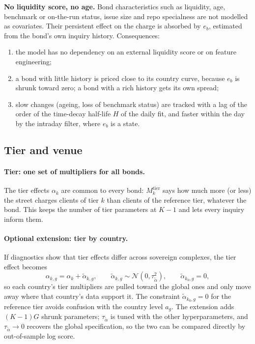 \documentclass[11pt,a4paper]{article}
\theoremstyle{definition}
\theoremstyle{remark}
\begin{document}
\begin{decision}
\textbf{No liquidity score, no age.} Bond characteristics such as liquidity, age, benchmark or on-the-run status, issue size and repo specialness are not modelled as covariates. Their persistent effect on the charge is absorbed by $e_b$, estimated from the bond's own inquiry history. Consequences:
\begin{enumerate}[itemsep=1pt,label=(\alph*)]
\item the model has no dependency on an external liquidity score or on feature engineering;
\item a bond with little history is priced close to its country curve, because $e_b$ is shrunk toward zero; a bond with a rich history gets its own spread;
\item slow changes (ageing, loss of benchmark status) are tracked with a lag of the order of the time-decay half-life $H$ of the daily fit, and faster within the day by the intraday filter, where $e_b$ is a state.
\end{enumerate}
\end{decision}

\subsection{Tier and venue}\label{sec:tiervenue}

\paragraph{Tier: one set of multipliers for all bonds.} The tier effects $\alpha_k$ are common to every bond: $M^{\mathrm{tier}}_k$ says how much more (or less) the street charges clients of tier $k$ than clients of the reference tier, whatever the bond. This keeps the number of tier parameters at $K-1$ and lets every inquiry inform them.

\paragraph{Optional extension: tier by country.} If diagnostics show that tier effects differ across sovereign complexes, the tier effect becomes
\begin{equation}\label{eq:tiercountry}
\alpha_{k,g}=\alpha_k+\tilde\alpha_{k,g},\qquad \tilde\alpha_{k,g}\sim\mathcal N(0,\tau_{\tilde\alpha}^2),\qquad \tilde\alpha_{k_0,g}=0,
\end{equation}
so each country's tier multipliers are pulled toward the global ones and only move away where that country's data support it. The constraint $\tilde\alpha_{k_0,g}=0$ for the reference tier avoids confusion with the country level $a_g$. The extension adds $(K-1)G$ shrunk parameters; $\tau_{\tilde\alpha}$ is tuned with the other hyperparameters, and $\tau_{\tilde\alpha}\to0$ recovers the global specification, so the two can be compared directly by out-of-sample log score.
\end{document}

